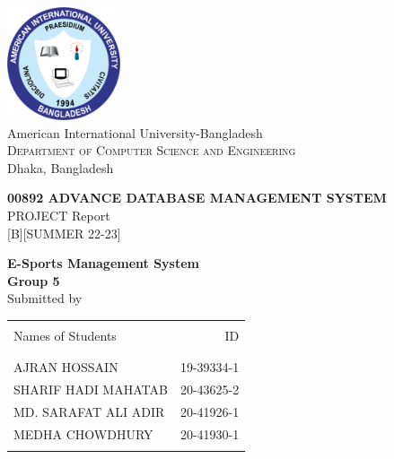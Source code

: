 \begin{titlepage}

       \begin{center}
              \includegraphics[width=0.25\textwidth]{images/aiub-logo}\\[0.1in]
              \Large{American International University-Bangladesh}\\
              \normalsize
              \textsc{Department of Computer Science and Engineering}\\
              Dhaka, Bangladesh \\
              \vspace{1cm}

              \textup{\small {\bf 00892 ADVANCE DATABASE MANAGEMENT SYSTEM} \\PROJECT Report}\\[0.1in]
              [B][SUMMER 22-23]

              \vspace{1cm}
              \Large \textbf {E-Sports Management System}\\[0.2in]
              \textbf{Group 5} \\[0.2in]
              \normalsize Submitted by \\
              \begin{table}[h]
                     \centering
                     \begin{tabular}{lr}\hline                        \\
                            Names of Students    & ID         \\ \\ \hline
                            \\
                            AJRAN HOSSAIN        & 19-39334-1 \\
                            SHARIF HADI MAHATAB  & 20-43625-2 \\
                            MD. SARAFAT ALI ADIR & 20-41926-1 \\
                            MEDHA CHOWDHURY      & 20-41930-1 \\ \\ \hline
                     \end{tabular}
              \end{table}


\end{center}
\end{titlepage}
